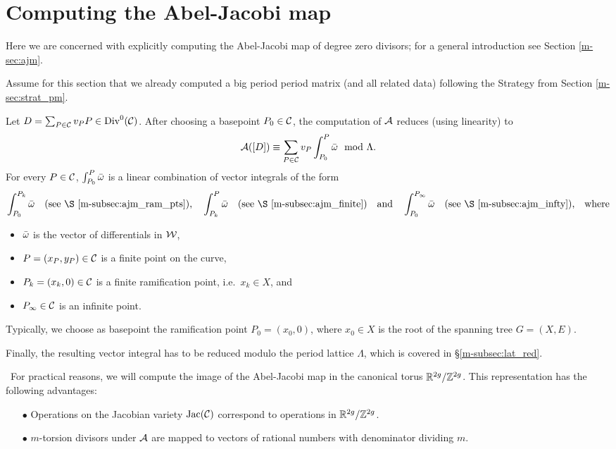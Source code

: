 \documentclass[main.tex]{subfiles}
\begin{document}
  \section{Computing the Abel-Jacobi map}\label{sec:comp_ajm}

   Here we are concerned with explicitly computing the Abel-Jacobi map of degree zero divisors; for a general introduction see Section \ref{m-sec:ajm}.

   Assume for this section that we already computed a big period period matrix (and all related data) following the Strategy from Section \ref{m-sec:strat_pm}.

   Let $D = \sum_{P \in \mathcal{C}} v_P P \in \operatorname{Div}^0(\mathcal{C})$. After choosing a basepoint $P_0 \in \mathcal{C}$, the computation of $\mathcal{A}$ reduces (using linearity) to
   \begin{equation*}
     \mathcal{A}([D]) \equiv \sum_{P \in \mathcal{C}} v_P \int_{P_0}^P \bar{\omega} \mod \Lambda.
   \end{equation*}
  For every $P \in \mathcal{C}$, $\int_{P_0}^P \bar{\omega}$ is a linear combination of vector integrals of the form
  \begin{align*}
    \int_{P_0}^{P_k} \bar\w\quad \text{(see \S \ref{m-subsec:ajm_ram_pts}),} \quad
    \int_{P_k}^{P} \bar\w \quad \text{(see \S \ref{m-subsec:ajm_finite})}
    \quad \text{and} \quad \int_{P_0}^{P_{\infty}} \bar\w\quad \text{(see \S \ref{m-subsec:ajm_infty}),} \quad \text{where}
  \end{align*}
  \begin{itemize}
   \item $\bar{\omega}$ is the vector of differentials in $\mathcal{W}$,
   \item $P = (x_P,y_P) \in \mathcal{C}$ is a finite point on the curve,
   \item $P_k = (x_k,0) \in \mathcal{C}$ is a finite ramification point, i.e.\ $x_k \in X$, and
   \item $P_{\infty} \in \mathcal{C}$ is an infinite point.
  \end{itemize}

   Typically, we choose as basepoint the ramification point $P_0 = (x_0,0)$, where $x_0 \in X$ is the root of the spanning tree $G = (X,E)$.

  Finally, the resulting vector integral has to be reduced modulo the period lattice $\Lambda$, which is covered in \S \ref{m-subsec:lat_red}.

   \begin{rmk} \
  For practical reasons, we will compute the
  image of the Abel-Jacobi map in the canonical torus $\mathbb{R}^{2g} / \mathbb{Z}^{2g}$.
This representation has the following advantages:
    \begin{itemize}
     \item[$\bullet$] Operations on the Jacobian variety $\operatorname{Jac}(\mathcal{C})$ correspond to operations in $\mathbb{R}^{2g}/\mathbb{Z}^{2g}$.
     \item[$\bullet$] $m$-torsion divisors under $\mathcal{A}$ are mapped to vectors of rational numbers with
     denominator dividing $m$.
         \end{itemize}
   \end{rmk}
\end{document}
